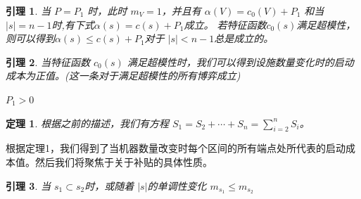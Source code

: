 \documentclass[UTF8]{article}
\newtheorem{thm}{\hspace{2em}定理}
\newtheorem{lem}{\hspace{2em}引理}
\begin{document}
\begin{lem}\label{lem3}
当 $P=P_1$ 时，此时 $m_V=1$，并且有 $\alpha(V)=c_0(V)+P_1$ 和当 $\left| s \right|= n-1$时,有下式$\alpha(s)=c(s)+P_1$成立。
若特征函数$c_0(s)$满足超模性，则可以得到$\alpha(s) \leq c(s)+P_1$对于 $\left| s \right| < n-1 $总是成立的。
\end{lem}


\begin{lem}\label{lem4}
当特征函数 $c_0(s)$ 满足超模性时，我们可以得到设施数量变化时的启动成本为正值。(这一条对于满足超模性的所有博弈成立)

$P_1 > 0$

\end{lem}


\begin{thm}
根据之前的描述，我们有方程
$S_{1}=S_{2}+\cdots+S_{n}=\sum_{i=2}^n S_i$。\\

\end{thm}

根据定理1，我们得到了当机器数量改变时每个区间的所有端点处所代表的启动成本值。然后我们将聚焦于关于补贴的具体性质。

\begin{lem}\label{lem5}
当 $s_1 \subset s_2$时，或随着 $\left|s\right|$的单调性变化
$m_{s_1} \leq m_{s_2}$
\end{lem}
\end{document}
